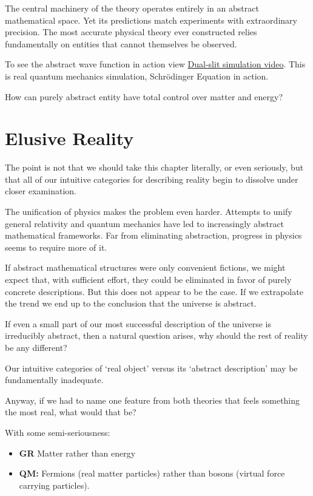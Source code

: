 The central machinery of the theory operates entirely in an abstract mathematical space. Yet its predictions match experiments with extraordinary precision.
The most accurate physical theory ever constructed relies fundamentally on entities that cannot themselves be observed.

To see the abstract wave function in action view \href{https://youtube.com/shorts/QyaOh_qSqLM}{Dual-slit simulation video}.
This is real quantum mechanics simulation, Schrödinger Equation in action. 

How can purely abstract entity have total control over matter and energy? 


\section{Elusive Reality}


The point is not that we should take this chapter literally, or even seriously, but that all of our intuitive categories for describing reality begin to dissolve under closer examination.

The unification of physics makes the problem even harder. Attempts to unify general relativity and quantum mechanics have led to increasingly
abstract mathematical frameworks. Far from eliminating abstraction, progress in physics seems to require more of it.

If abstract mathematical structures were only convenient fictions, we might expect that, with sufficient effort, they could be eliminated in favor of purely concrete descriptions.
But this does not appear to be the case. If we extrapolate the trend we end up to the conclusion that the universe is abstract.

If even a small part of our most successful description of the universe is irreducibly abstract, then a natural question arises, why should the rest of reality be any different?

Our intuitive categories of ‘real object’ versus its ‘abstract description’ may be fundamentally inadequate.

Anyway, if we had to name one feature from both theories that feels something the most real, what would that be?

With some semi-seriousness:

\begin{itemize}
\item \textbf{GR} Matter rather than energy
\item \textbf{QM:} Fermions (real matter particles) rather than bosons (virtual force carrying particles).
\end{itemize}


